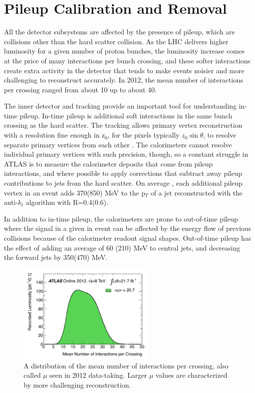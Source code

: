 
\section{Pileup Calibration and Removal}
\label{sec:pileup}
All the detector subsystems are affected by the presence of pileup, which are collisions other than the hard scatter 
collision.  As the LHC delivers higher luminosity for a given number of proton bunches, the luminosity increase comes 
at the price of many interactions per bunch crossing, and these softer interactions create extra activity in the detector 
that tends to make events noisier and more challenging to reconstruct accurately.  In 2012, the mean number of 
interactions per crossing ranged from about 10 up to about 40.  

The inner detector and tracking provide an important tool for understanding in-time pileup.  In-time pileup 
is additional soft interactions in the same bunch crossing as the hard scatter.  The tracking allows primary vertex reconstruction 
with a resolution fine enough in z$_0$, for the pixels typically $z_0\sin\theta$, 
to resolve separate primary vertices from each other \cite{pileup_tracks}.   The calorimeters cannot resolve individual primary vertices with such precision, 
though, so a constant struggle in ATLAS is to measure the calorimeter deposits that come from pileup interactions, 
and where possible to apply corrections that subtract away pileup contributions to jets from the hard scatter.  On average
, each additional pileup vertex in an event adds 370(850) \cite{pileup} MeV to the p$_T$ of a jet reconstructed with the anti-$k_t$ algorithm with R=0.4(0.6).

In addition to in-time pileup, the calorimeters are prone to out-of-time pileup where 
the signal in a given in event can be affected by the energy flow of previous collisions because of the 
calorimeter readout signal shapes.  Out-of-time pileup has the effect of adding an average of 60
(210) MeV to central jets, and decreasing the forward jets by 350(470) MeV.  


\begin{figure}
    \center
	\includegraphics[width=0.6\textwidth]{ReconstructionPerformance/images/mu_2012-dec.pdf}
	\caption{A distribution of the mean number of interactions per crossing, also called $\mu$ seen in 2012 data-taking.  Larger $\mu$ values are characterized by more challenging reconstruction. 	\label{fig:mu_2012}  }
\end{figure}

